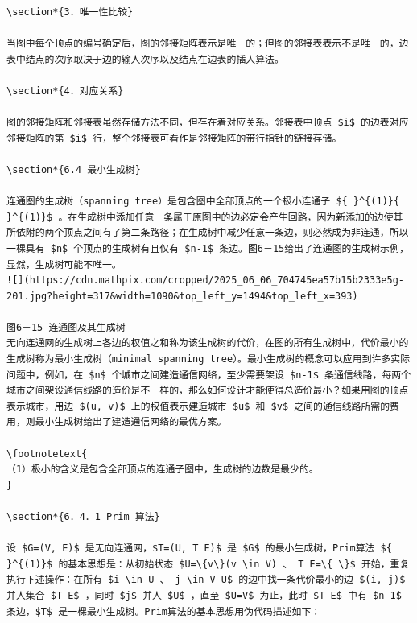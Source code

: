 \documentclass[10pt]{article}
\let\svthefootnote\thefootnote
\newcommand\blfootnotetext[1]{%
  \let\thefootnote\relax\footnote{#1}%
  \addtocounter{footnote}{-1}%
  \let\thefootnote\svthefootnote%
}
\let\svfootnotetext\footnotetext
\renewcommand\footnotetext[2][?]{%
  \if\relax#1\relax%
    \ifnum\value{footnote}=0\blfootnotetext{#2}\else\svfootnotetext{#2}\fi%
  \else%
    \if?#1\ifnum\value{footnote}=0\blfootnotetext{#2}\else\svfootnotetext{#2}\fi%
    \else\svfootnotetext[#1]{#2}\fi%
  \fi
}
\begin{document}
\begin{verbatim}
\section*{3．唯一性比较}

当图中每个顶点的编号确定后，图的邻接矩阵表示是唯一的；但图的邻接表表示不是唯一的，边表中结点的次序取决于边的输人次序以及结点在边表的插人算法。

\section*{4．对应关系}

图的邻接矩阵和邻接表虽然存储方法不同，但存在着对应关系。邻接表中顶点 $i$ 的边表对应邻接矩阵的第 $i$ 行，整个邻接表可看作是邻接矩阵的带行指针的链接存储。

\section*{6.4 最小生成树}

连通图的生成树（spanning tree）是包含图中全部顶点的一个极小连通子 ${ }^{(1)}{ }^{(1)}$ 。在生成树中添加任意一条属于原图中的边必定会产生回路，因为新添加的边使其所依附的两个顶点之间有了第二条路径；在生成树中减少任意一条边，则必然成为非连通，所以一棵具有 $n$ 个顶点的生成树有且仅有 $n-1$ 条边。图6－15给出了连通图的生成树示例，显然，生成树可能不唯一。
![](https://cdn.mathpix.com/cropped/2025_06_06_704745ea57b15b2333e5g-201.jpg?height=317&width=1090&top_left_y=1494&top_left_x=393)

图6－15 连通图及其生成树
无向连通网的生成树上各边的权值之和称为该生成树的代价，在图的所有生成树中，代价最小的生成树称为最小生成树（minimal spanning tree）。最小生成树的概念可以应用到许多实际问题中，例如，在 $n$ 个城市之间建造通信网络，至少需要架设 $n-1$ 条通信线路，每两个城市之间架设通信线路的造价是不一样的，那么如何设计才能使得总造价最小？如果用图的顶点表示城市，用边 $(u, v)$ 上的权值表示建造城市 $u$ 和 $v$ 之间的通信线路所需的费用，则最小生成树给出了建造通信网络的最优方案。

\footnotetext{
（1）极小的含义是包含全部顶点的连通子图中，生成树的边数是最少的。
}

\section*{6．4．1 Prim 算法}

设 $G=(V, E)$ 是无向连通网，$T=(U, T E)$ 是 $G$ 的最小生成树，Prim算法 ${ }^{(1)}$ 的基本思想是：从初始状态 $U=\{v\}(v \in V) 、 T E=\{ \}$ 开始，重复执行下述操作：在所有 $i \in U 、 j \in V-U$ 的边中找一条代价最小的边 $(i, j)$ 并人集合 $T E$ ，同时 $j$ 并人 $U$ ，直至 $U=V$ 为止，此时 $T E$ 中有 $n-1$ 条边，$T$ 是一棵最小生成树。Prim算法的基本思想用伪代码描述如下：
\end{verbatim}
\end{document}
